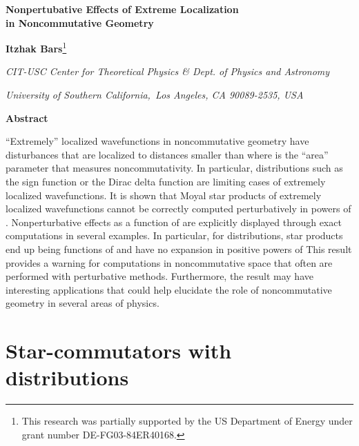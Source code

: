 \documentclass[a4paper,12pt]{article}
\begin{document}

{\vskip1.5cm}

\begin{center}
{\Large \textbf{Nonpertubative Effects of Extreme Localization\\[0pt]
in Noncommutative Geometry}}

\bigskip

{\vskip1.0cm}

\textbf{Itzhak Bars}{\footnote{%
This research was partially supported by the US Department of Energy under
grant number DE-FG03-84ER40168.}}

{\vskip1.0cm}

\textsl{CIT-USC Center for Theoretical Physics \& Dept. of Physics and
Astronomy}

\textsl{University of Southern California,\ Los Angeles, CA 90089-2535, USA}

{\vskip1.5cm}

\textbf{Abstract}
\end{center}

{\vskip1.0cm}

``Extremely'' localized wavefunctions in noncommutative geometry have
disturbances that are localized to distances smaller than \myHighlight{$\sqrt{\theta },$}\coordHE{}
where \myHighlight{$\theta $}\coordHE{} is the ``area'' parameter that measures noncommutativity. In
particular, distributions such as the sign function or the Dirac delta
function are limiting cases of extremely localized wavefunctions. It is
shown that Moyal star products of extremely localized wavefunctions cannot
be correctly computed perturbatively in powers of \myHighlight{$\theta $}\coordHE{}. Nonperturbative
effects as a function of \myHighlight{$\theta $}\coordHE{} are explicitly displayed through exact
computations in several examples. In particular, for distributions, star
products end up being functions of \coordHE{} and have no expansion in
positive powers of \coordHE{} This result provides a warning for
computations in noncommutative space that often are performed with
perturbative methods. Furthermore, the result may have interesting
applications that could help elucidate the role of noncommutative geometry
in several areas of physics.

\newpage

\section{Star-commutators with distributions}
\end{document}
